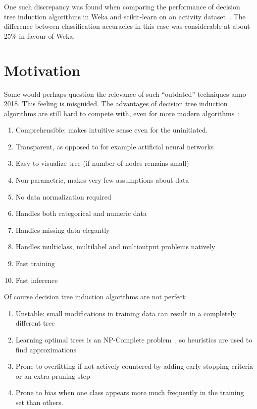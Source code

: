 One such discrepancy was found when comparing the performance of decision tree induction algorithms in Weka and scikit-learn on an activity dataset~\cite{problematic_dataset}. The difference between classification accuracies in this case was considerable at about 25\% in favour of Weka.

\section{Motivation}
Some would perhaps question the relevance of such ``outdated'' techniques anno 2018. This feeling is misguided. The advantages of decision tree induction algorithms are still hard to compete with, even for more modern algorithms~\cite{scikit-learn, murthy1998automatic, kotsiantis2007supervised}:

\begin{enumerate}
    \item Comprehensible: makes intuitive sense even for the uninitiated.
    \item Transparent, as opposed to for example artificial neural networks
    \item Easy to visualize tree (if number of nodes remains small)
    \item Non-parametric, makes very few assumptions about data
    \item No data normalization required
    \item Handles both categorical and numeric data
    \item Handles missing data elegantly %
    \item Handles multiclass, multilabel and multioutput problems natively
    \item Fast training
    \item Fast inference
\end{enumerate}

Of course decision tree induction algorithms are not perfect:
\begin{enumerate}
    \item Unstable: small modifications in training data can result in a completely different tree
    \item Learning optimal trees is an NP-Complete problem~\cite{npcomplete}, so heuristics are used to find approximations
    \item Prone to overfitting if not actively countered by adding early stopping criteria or an extra pruning step
    \item Prone to bias when one class appears more much frequently in the training set than others.
\end{enumerate}


